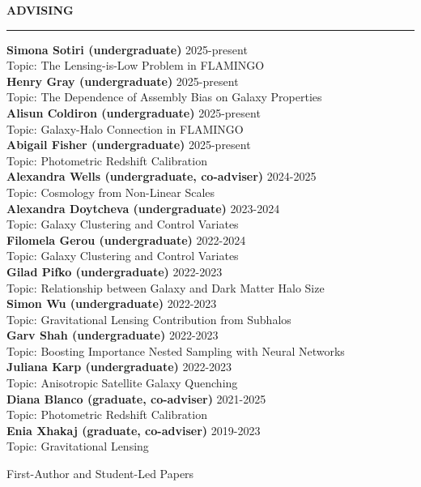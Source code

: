 \documentclass[12pt]{article}
\renewenvironment{section}[1]
  {
  \medskip
  {\color{aublue} \MakeUppercase{\bf #1}}
  \smallskip
  \hrule
  \medskip
  \begin{adjustwidth}{0.3cm}{}
  }
  {
  \end{adjustwidth}
  }
\newenvironment{ref-section}[1]
  {
  \medskip
  {\color{aublue} \MakeUppercase{\bf #1}}
  \smallskip
  \hrule
  \medskip
  \begin{refsection}
  }
  {
  \end{refsection}
  }
\newcommand{\entry}[3]{{\bf #1} \hfill {#2} \\ {#3}}
\begin{document}
\begin{section}{Advising}
  \entry{Simona Sotiri (undergraduate)}{2025-present}{Topic: The Lensing-is-Low Problem in FLAMINGO} \\
  \entry{Henry Gray (undergraduate)}{2025-present}{Topic: The Dependence of Assembly Bias on Galaxy Properties} \\
  \entry{Alisun Coldiron (undergraduate)}{2025-present}{Topic: Galaxy-Halo Connection in FLAMINGO} \\
  \entry{Abigail Fisher (undergraduate)}{2025-present}{Topic: Photometric Redshift Calibration} \\
  \entry{Alexandra Wells (undergraduate, co-adviser)}{2024-2025}{Topic: Cosmology from Non-Linear Scales} \\
  \entry{Alexandra Doytcheva (undergraduate)}{2023-2024}{Topic: Galaxy Clustering and Control Variates} \\
  \entry{Filomela Gerou (undergraduate)}{2022-2024}{Topic: Galaxy Clustering and Control Variates} \\
  \entry{Gilad Pifko (undergraduate)}{2022-2023}{Topic: Relationship between Galaxy and Dark Matter Halo Size} \\
  \entry{Simon Wu (undergraduate)}{2022-2023}{Topic: Gravitational Lensing Contribution from Subhalos} \\
  \entry{Garv Shah (undergraduate)}{2022-2023}{Topic: Boosting Importance Nested Sampling with Neural Networks} \\
  \entry{Juliana Karp (undergraduate)}{2022-2023}{Topic: Anisotropic Satellite Galaxy Quenching} \\
  \entry{Diana Blanco (graduate, co-adviser)}{2021-2025}{Topic: Photometric Redshift Calibration} \\
  \entry{Enia Xhakaj (graduate, co-adviser)}{2019-2023}{Topic: Gravitational Lensing} \\
\end{section}

\begin{ref-section}{First-Author and Student-Led Papers}
  \nocite{Doytcheva2024_ApJ_977_184, Lange2024_OJAp_7_57, Lange2023_MNRAS_525_3181, Karp2023_ApJ_949_13, Lange2023_MNRAS_520_5373, Lange2022_MNRAS_509_1779, Lange2021_MNRAS_502_2074, Lange2019_MNRAS_490_1870, Lange2019_MNRAS_488_5771, Lange2019_MNRAS_487_3112, Lange2019_MNRAS_482_4824, Lange2018_MNRAS_473_2830, Lange2016_ApJ_819_4, Lange2015_MNRAS_447_939, Lange2013_AA_551_89}
  \printbibliography[heading=none]
\end{ref-section}
\end{document}
